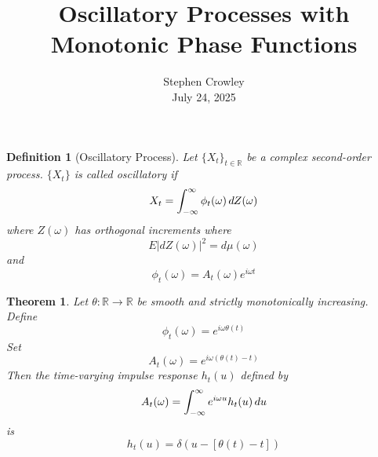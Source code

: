 \documentclass{article}
\newcommand{\tmaffiliation}[1]{\\ #1}
\newtheorem{definition}{Definition}
\newtheorem{theorem}{Theorem}
\begin{document}
\title{Oscillatory Processes with Monotonic Phase Functions}

\author{
  Stephen Crowley
  \tmaffiliation{July 24, 2025}
}

\maketitle

\begin{definition}
  [Oscillatory Process] Let $\{X_t \}_{t \in \mathbb{R}}$ be a complex
  second-order process. $\{X_t \}$ is called oscillatory if
  \begin{equation}
    X_t = \int_{- \infty}^{\infty} \phi_t (\omega)  \hspace{0.17em} dZ
    (\omega)
  \end{equation}
  where $Z (\omega)$ has orthogonal increments where
  \begin{equation}
    E |dZ (\omega) |^2 = d \mu (\omega)
  \end{equation}
  and
  \begin{equation}
    \phi_t (\omega) = A_t (\omega) e^{i \omega t}
  \end{equation}
\end{definition}

\begin{theorem}
  Let $\theta : \mathbb{R} \to \mathbb{R}$ be smooth and strictly
  monotonically increasing. Define
  \begin{equation}
    \phi_t (\omega) = e^{i \omega \theta (t)}
  \end{equation}
  Set
  \begin{equation}
    A_t (\omega) = e^{i \omega (\theta (t) - t)}
  \end{equation}
  Then the time-varying impulse response $h_t (u)$ defined by
  \begin{equation}
    A_t (\omega) = \int_{- \infty}^{\infty} e^{i \omega u} h_t (u) 
    \hspace{0.17em} du
  \end{equation}
  is
  \begin{equation}
    h_t (u) = \delta (u - [\theta (t) - t])
  \end{equation}
\end{theorem}
\end{document}

